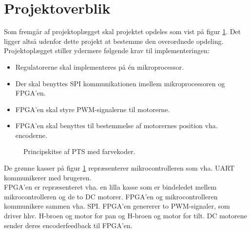 \section{Projektoverblik}
\label{sec:projektoverblik}
Som fremgår af projektoplægget skal projektet opdeles som vist på 
figur \ref{fig:overview_openloop_PTS}. 
Det ligger altså udenfor dette projekt at bestemme den overordnede opdeling.
Projektoplægget stiller ydermere følgende krav til implementeringen:
\begin{itemize}
\itemsep1pt
  \item Regulatorerne skal implementeres på én mikroprocessor.
  \item Der skal benyttes SPI kommunikationen imellem mikroprocessoren og FPGA’en.
  \item FPGA’en skal styre PWM-signalerne til motorerne.
  \item FPGA’en skal benyttes til bestemmelse af motorernes position vha. encoderne.
\end{itemize}

\bigskip

\begin{figure}[!th]
\centering
\begin{tikzpicture}[auto, node distance=1cm,>=latex']

\end{tikzpicture}
\caption[Principskitse af PTS]{Principskitse af PTS med farvekoder.}
\label{fig:overview_openloop_PTS}
\end{figure}
De grønne kasser på figur \ref{fig:overview_openloop_PTS} repræsenterer mikrocontrolleren som vha. UART kommunikerer med brugeren. \\
FPGA'en er repræsenteret vha. en lilla kasse som er bindeledet mellem mikrocontrolleren og de to DC motorer. 
FPGA'en og mikrocontrolleren kommunikere sammen vha. SPI. FPGA'en genererer to PWM-signaler, som driver hhv. H-broen og motor for pan og H-broen og motor for tilt. DC motorene sender deres encoderfeedback til FPGA'en.